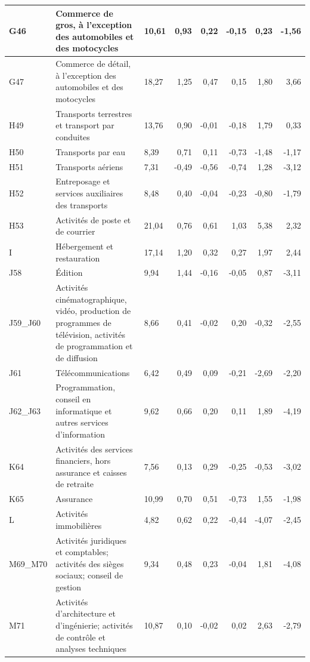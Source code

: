 \begin{small}
\begin{longtable}{m{1.3cm}m{5.7cm}m{1cm}rrrrr}
	\hline
	G46 & Commerce de gros, à l'exception des automobiles et des motocycles & 10,61 & 0,93 & 0,22 & -0,15 & 0,23 & -1,56 \\ 
	\hline
	G47 & Commerce de détail, à l'exception des automobiles et des motocycles & 18,27 & 1,25 & 0,47 & 0,15 & 1,80 & 3,66 \\ 
	\hline
	H49 & Transports terrestres et transport par conduites & 13,76 & 0,90 & -0,01 & -0,18 & 1,79 & 0,33 \\ 
	\hline
	H50 & Transports par eau & 8,39 & 0,71 & 0,11 & -0,73 & -1,48 & -1,17 \\ 
	\hline
	H51 & Transports aériens & 7,31 & -0,49 & -0,56 & -0,74 & 1,28 & -3,12 \\ 
	\hline
	H52 & Entreposage et services auxiliaires des transports & 8,48 & 0,40 & -0,04 & -0,23 & -0,80 & -1,79 \\ 
	\hline
	H53 & Activités de poste et de courrier & 21,04 & 0,76 & 0,61 & 1,03 & 5,38 & 2,32 \\ 
	\hline
	I & Hébergement et restauration & 17,14 & 1,20 & 0,32 & 0,27 & 1,97 & 2,44 \\ 
	\hline
	J58 & Édition & 9,94 & 1,44 & -0,16 & -0,05 & 0,87 & -3,11 \\ 
	\hline
	J59\_J60 & Activités cinématographique, vidéo, production de programmes de télévision, activités de programmation et de diffusion & 8,66 & 0,41 & -0,02 & 0,20 & -0,32 & -2,55 \\ 
	\hline
	J61 & Télécommunications & 6,42 & 0,49 & 0,09 & -0,21 & -2,69 & -2,20 \\ 
	\hline
	J62\_J63 & Programmation, conseil en informatique et autres services d'information & 9,62 & 0,66 & 0,20 & 0,11 & 1,89 & -4,19 \\ 
	\hline
	K64 & Activités des services financiers, hors assurance et caisses de retraite & 7,56 & 0,13 & 0,29 & -0,25 & -0,53 & -3,02 \\ 
	\hline
	K65 & Assurance & 10,99 & 0,70 & 0,51 & -0,73 & 1,55 & -1,98 \\ 
	\hline
	L & Activités immobilières & 4,82 & 0,62 & 0,22 & -0,44 & -4,07 & -2,45 \\ 
	\hline
	M69\_M70 & Activités juridiques et comptables; activités des sièges sociaux; conseil de gestion & 9,34 & 0,48 & 0,23 & -0,04 & 1,81 & -4,08 \\ 
	\hline
	M71 & Activités d'architecture et d'ingénierie; activités de contrôle et analyses techniques & 10,87 & 0,10 & -0,02 & 0,02 & 2,63 & -2,79 \\ 

\end{longtable}
\end{small}
